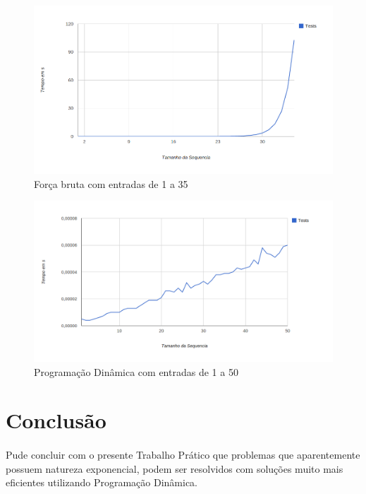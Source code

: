 \documentclass[a4paper, 12pt]{article}
\begin{document}
\begin{figure}[!h]
\centering
\includegraphics[scale=0.4]{graficoBF.png}
\caption{Força bruta com entradas de 1 a 35}
\end{figure}

\begin{figure}[!h]
\centering
\includegraphics[scale=0.4]{graficoPD.png}
\caption{Programação Dinâmica com entradas de 1 a 50}
\end{figure}

\section{Conclusão}
\paragraph{}
Pude concluir com o presente Trabalho Prático que problemas que aparentemente possuem natureza exponencial, podem ser resolvidos com soluções muito mais eficientes utilizando Programação Dinâmica.
\end{document}
